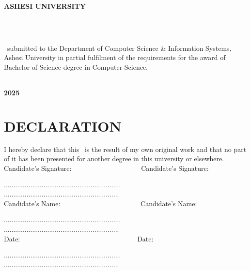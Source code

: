 \documentclass[a4paper,12pt,oneside]{report}
\begin{document}
\thispagestyle{empty}
\begin{center}
	\textsc{ \large{\textbf{ASHESI UNIVERSITY}\\}}
	\vspace{37mm}

	\textsc{ \large{\textbf{\projecttitle\\ }}}
	\vspace{37mm}

	\textnormal{ \large{\textbf{\MakeUppercase \projecttype}\\}}
	\vspace{15mm}
	\textup{\large \projecttype \ submitted to the Department of Computer Science \& Information Systems, Ashesi University in partial fulfilment of the requirements for the award of Bachelor of Science degree in Computer Science.}\\
	\vspace{27mm}

	\textup{\large \textbf{\projectauthor}}\\
	\textup{\large \textbf{2025}}\\
\end{center}

\newpage
{}
\section*{\centering DECLARATION}
I hereby declare that this \projecttype \ is the result of
my own original work and that no part of it has been presented for
another degree in this university or elsewhere. \\

Candidate's Signature:$\qquad\qquad\qquad\qquad\qquad\;$Candidate's Signature:

..............................................................$\qquad\qquad$.............................................................\\

Candidate's Name:$\qquad\qquad\qquad\qquad\qquad\quad\;\;\;$Candidate's Name:

..............................................................$\qquad\qquad$.............................................................\\

Date:$\qquad\qquad\qquad\qquad\qquad\qquad\qquad\qquad\quad\;$Date:

..............................................................$\qquad\qquad$.............................................................\\\\\\
\end{document}
